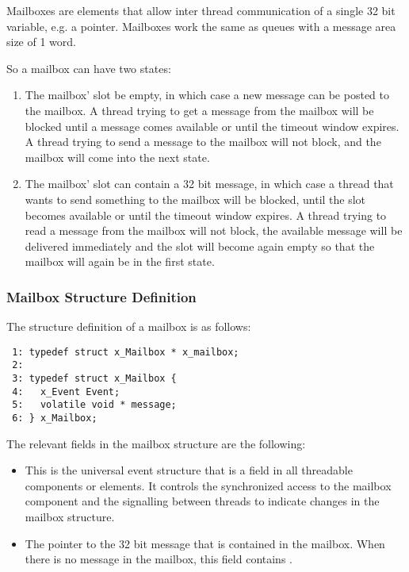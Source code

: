 Mailboxes are elements that allow inter thread communication of a single 32
bit variable, e.g. a pointer. Mailboxes work the same as queues with a
message area size of 1 word.

So a mailbox can have two states:

\begin{enumerate}
\item The mailbox' slot be empty, in which case a new message can be posted
to the mailbox. A thread trying to get a message from the mailbox will be
blocked until a message comes available or until the timeout window expires.
A thread trying to send a message to the mailbox will not block, and the
mailbox will come into the next state.
\item The mailbox' slot can contain a 32 bit message, in which case a thread
that wants to send something to the mailbox will be blocked, until the slot
becomes available or until the timeout window expires. A thread trying to
read a message from the mailbox will not block, the available message will
be delivered immediately and the slot will become again empty so that the
mailbox will again be in the first state.
\end{enumerate}

\subsubsection{Mailbox Structure Definition}

The structure definition of a mailbox is as follows:

\bcode
\begin{verbatim}
 1: typedef struct x_Mailbox * x_mailbox;
 2:
 3: typedef struct x_Mailbox {
 4:   x_Event Event;
 5:   volatile void * message;
 6: } x_Mailbox;
\end{verbatim}
\ecode

The relevant fields in the mailbox structure are the following:

\begin{itemize}
\item {} This is the universal event structure that is a field
in all threadable components or elements. It controls the synchronized access
to the mailbox component and the signalling between threads to indicate changes
in the mailbox structure.
\item {} The pointer to the 32 bit
message that is contained in the mailbox. When there is no message in the
mailbox, this field contains .
\end{itemize}


